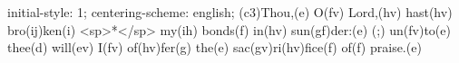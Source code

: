 initial-style: 1;
centering-scheme: english;
(c3)Thou,(e) O(fv) Lord,(hv) hast(hv) bro(ij)ken(i) <sp>*</sp> my(ih) bonds(f) in(hv) sun(gf)der:(e) (;) un(fv)to(e) thee(d) will(ev) I(fv) of(hv)fer(g) the(e) sac(gv)ri(hv)fice(f) of(f) praise.(e)
